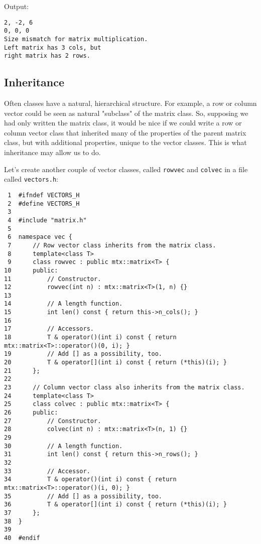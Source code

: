 \documentclass[11pt]{article}
\begin{document}
Output:

\begin{verbatim}
2, -2, 6
0, 0, 0
Size mismatch for matrix multiplication.
Left matrix has 3 cols, but
right matrix has 2 rows.
\end{verbatim}

\subsection{Inheritance}
\label{sec:orgheadline62}

Often classes have a natural, hierarchical structure.
For example, a row or column vector could be seen as natural
"subclass" of the matrix class. So, supposing we had only 
written the matrix class, it would be nice if we could write 
a row or column vector class that inherited many of the properties 
of the parent matrix class, but with additional properties, 
unique to the vector classes. This is what inheritance may allow 
us to do.

Let's create another couple of vector classes, called \texttt{rowvec} and
\texttt{colvec} in a file called \texttt{vectors.h}:

\begin{verbatim}
 1  #ifndef VECTORS_H
 2  #define VECTORS_H
 3  
 4  #include "matrix.h"
 5  
 6  namespace vec {
 7      // Row vector class inherits from the matrix class.
 8      template<class T>
 9      class rowvec : public mtx::matrix<T> {
10      public:
11          // Constructor.
12          rowvec(int n) : mtx::matrix<T>(1, n) {}
13  
14          // A length function.
15          int len() const { return this->n_cols(); }
16  
17          // Accessors.
18          T & operator()(int i) const { return mtx::matrix<T>::operator()(0, i); }
19          // Add [] as a possibility, too.
20          T & operator[](int i) const { return (*this)(i); }
21      };
22  
23      // Column vector class also inherits from the matrix class.
24      template<class T>
25      class colvec : public mtx::matrix<T> {
26      public:
27          // Constructor.
28          colvec(int n) : mtx::matrix<T>(n, 1) {}
29  
30          // A length function.
31          int len() const { return this->n_rows(); }
32  
33          // Accessor.
34          T & operator()(int i) const { return mtx::matrix<T>::operator()(i, 0); }
35          // Add [] as a possibility, too.
36          T & operator[](int i) const { return (*this)(i); }
37      };
38  }
39  
40  #endif
\end{verbatim}
\end{document}

